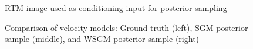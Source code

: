\documentclass{IMAGE2025}
\begin{document}
\begin{figure}


\caption{\label{fig-rtm-comparison}RTM image used as conditioning input
for posterior sampling}

\end{figure}%

\begin{figure}


\caption{\label{fig-velocity-models}Comparison of velocity models:
Ground truth (left), SGM posterior sample (middle), and WSGM posterior
sample (right)}

\end{figure}%
\end{document}
